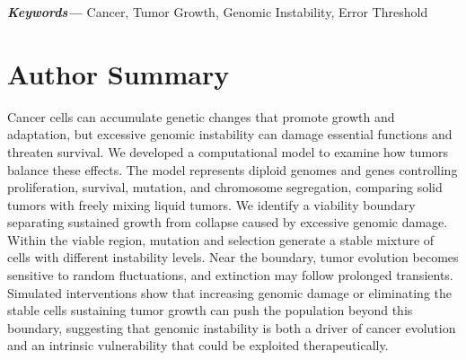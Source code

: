 \documentclass[10pt, aps, rmp,  twocolumn, superscriptaddress, floatfix, showkeys]{revtex4-2}
\providecommand{\keywords}[1]{\textbf{\textit{Keywords---}} #1}
\begin{document}
\keywords{Cancer, Tumor Growth, Genomic Instability, Error Threshold}

\maketitle

\section*{Author Summary}
\begin{graybox}
{\small Cancer cells can accumulate genetic changes that promote growth and adaptation, but excessive genomic instability can damage essential functions and threaten survival. We developed a computational model to examine how tumors balance these effects. The model represents diploid genomes and genes controlling proliferation, survival, mutation, and chromosome segregation, comparing solid tumors with freely mixing liquid tumors. We identify a viability boundary separating sustained growth from collapse caused by excessive genomic damage. Within the viable region, mutation and selection generate a stable mixture of cells with different instability levels. Near the boundary, tumor evolution becomes sensitive to random fluctuations, and extinction may follow prolonged transients. Simulated interventions show that increasing genomic damage or eliminating the stable cells sustaining tumor growth can push the population beyond this boundary, suggesting  that genomic instability is both a driver of cancer evolution and an intrinsic vulnerability that could be exploited therapeutically.}
\end{graybox}
\end{document}
